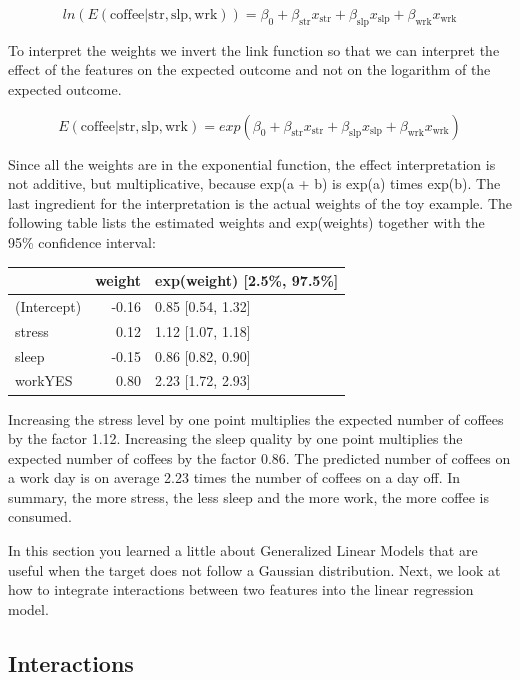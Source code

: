 \documentclass[12pt,]{krantz}
\begin{document}
\[ln(E(\text{coffee}|\text{str},\text{slp},\text{wrk}))=\beta_0+\beta_{\text{str}}x_{\text{str}}+\beta_{\text{slp}}x_{\text{slp}}+\beta_{\text{wrk}}x_{\text{wrk}}\]

To interpret the weights we invert the link function so that we can
interpret the effect of the features on the expected outcome and not on
the logarithm of the expected outcome.

\[E(\text{coffee}|\text{str},\text{slp},\text{wrk})=exp(\beta_0+\beta_{\text{str}}x_{\text{str}}+\beta_{\text{slp}}x_{\text{slp}}+\beta_{\text{wrk}}x_{\text{wrk}})\]

Since all the weights are in the exponential function, the effect
interpretation is not additive, but multiplicative, because exp(a + b)
is exp(a) times exp(b). The last ingredient for the interpretation is
the actual weights of the toy example. The following table lists the
estimated weights and exp(weights) together with the 95\% confidence
interval:

\begin{tabular}{l|r|l}
\hline
  & weight & exp(weight) [2.5\%, 97.5\%]\\
\hline
(Intercept) & -0.16 & 0.85 [0.54, 1.32]\\
\hline
stress & 0.12 & 1.12 [1.07, 1.18]\\
\hline
sleep & -0.15 & 0.86 [0.82, 0.90]\\
\hline
workYES & 0.80 & 2.23 [1.72, 2.93]\\
\hline
\end{tabular}

Increasing the stress level by one point multiplies the expected number
of coffees by the factor 1.12. Increasing the sleep quality by one point
multiplies the expected number of coffees by the factor 0.86. The
predicted number of coffees on a work day is on average 2.23 times the
number of coffees on a day off. In summary, the more stress, the less
sleep and the more work, the more coffee is consumed.

In this section you learned a little about Generalized Linear Models
that are useful when the target does not follow a Gaussian distribution.
Next, we look at how to integrate interactions between two features into
the linear regression model.

\hypertarget{lm-interact}{\subsection{Interactions}\label{lm-interact}}
\end{document}
